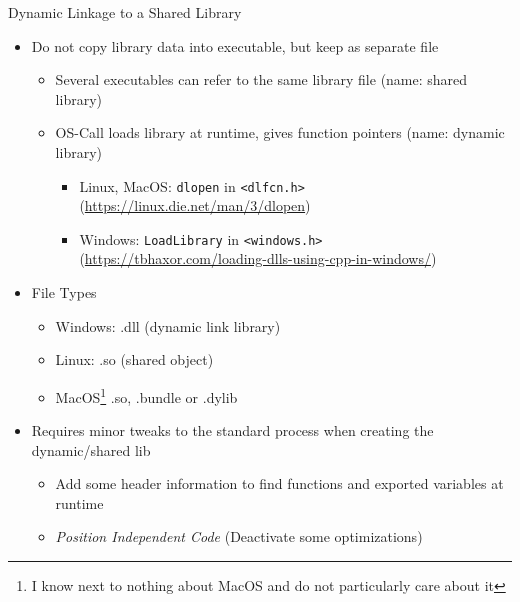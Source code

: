 \begin{frame}{Dynamic Linkage to a Shared Library}
%
\begin{itemize}
\item Do not copy library data into executable, but keep as separate file
	\begin{itemize}
	\item Several executables can refer to the same library file (\Thus name: shared library)
	\item OS-Call loads library at runtime, gives function pointers (\Thus name: dynamic library)
		\begin{itemize}
		\item Linux, MacOS: \texttt{dlopen} in \texttt{<dlfcn.h>}
			(\thus \url{https://linux.die.net/man/3/dlopen})
		\item Windows: \texttt{LoadLibrary} in \texttt{<windows.h>} \\
			 (\thus \url{https://tbhaxor.com/loading-dlls-using-cpp-in-windows/})
		\end{itemize}
	\end{itemize}
\item File Types
	\begin{itemize}
	\item Windows: .dll (dynamic link library)
	\item Linux: .so (shared object)
	\item MacOS\footnote{I know next to nothing about MacOS and do not particularly care about it} .so, .bundle or .dylib
	\end{itemize}
\item Requires minor tweaks to the standard process when creating the dynamic/shared lib
	\begin{itemize}
	\item Add some header information to find functions and exported variables at runtime
	\item \emph{Position Independent Code} (Deactivate some optimizations)
	\end{itemize}
\end{itemize}
%
\end{frame}


